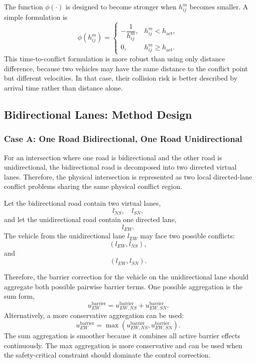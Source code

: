 \documentclass[conference]{IEEEtran}
\begin{document}
The function $\phi(\cdot)$ is designed to become stronger when $h_{ij}^m$ becomes smaller. A simple formulation is
\begin{equation}
\phi(h_{ij}^m)=
\begin{cases}
-\dfrac{1}{h_{ij}^m}, & h_{ij}^m < h_{\text{act}},\\[6pt]
0, & h_{ij}^m \geq h_{\text{act}}.
\end{cases}
\end{equation}
This time-to-conflict formulation is more robust than using only distance difference, because two vehicles may have the same distance to the conflict point but different velocities. In that case, their collision risk is better described by arrival time rather than distance alone.

\subsection{Bidirectional Lanes: Method Design}

\subsubsection{Case A: One Road Bidirectional, One Road Unidirectional}
For an intersection where one road is bidirectional and the other road is unidirectional, the bidirectional road is decomposed into two directed virtual lanes. Therefore, the physical intersection is represented as two local directed-lane conflict problems sharing the same physical conflict region.

Let the bidirectional road contain two virtual lanes,
\begin{equation}
l_{NS}, \quad l_{SN},
\end{equation}
and let the unidirectional road contain one directed lane,
\begin{equation}
l_{EW}.
\end{equation}
The vehicle from the unidirectional lane $l_{EW}$ may face two possible conflicts:
\begin{equation}
(l_{EW},l_{NS}),
\end{equation}
and
\begin{equation}
(l_{EW},l_{SN}).
\end{equation}

Therefore, the barrier correction for the vehicle on the unidirectional lane should aggregate both possible pairwise barrier terms. One possible aggregation is the sum form,
\begin{equation}
u_{EW}^{\text{barrier}}
=
u_{EW,NS}^{\text{barrier}}
+
u_{EW,SN}^{\text{barrier}}.
\end{equation}
Alternatively, a more conservative aggregation can be used:
\begin{equation}
u_{EW}^{\text{barrier}}
=
\max
\left(
u_{EW,NS}^{\text{barrier}},
u_{EW,SN}^{\text{barrier}}\right).
\end{equation}
The sum aggregation is smoother because it combines all active barrier effects continuously. The max aggregation is more conservative and can be used when the safety-critical constraint should dominate the control correction.
\end{document}
